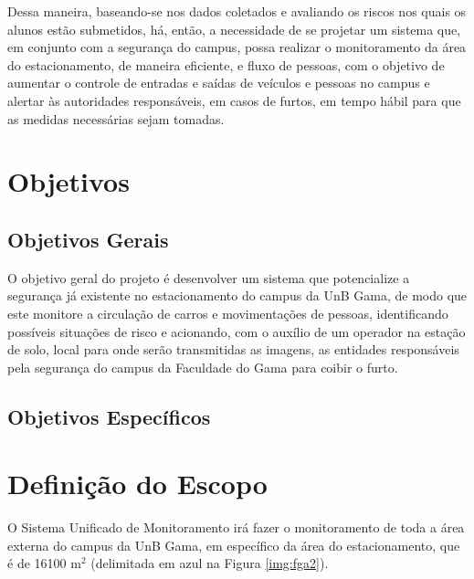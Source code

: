 Dessa maneira, baseando-se nos dados coletados e avaliando os riscos nos quais os alunos estão submetidos, há, então, a necessidade de se projetar  um sistema que, em conjunto com a segurança do campus, possa realizar o monitoramento  da área do estacionamento, de maneira eficiente, e fluxo de pessoas, com o objetivo de aumentar o controle de entradas e saídas de veículos e pessoas no campus e alertar às autoridades responsáveis, em casos de furtos, em tempo hábil para que as medidas necessárias sejam tomadas.


\section{Objetivos} %
\label{sec:objetivos}

  \subsection{Objetivos Gerais} %
  \label{sub:objetivos_gerais}

  O objetivo geral do projeto é desenvolver um sistema que potencialize a segurança já existente no estacionamento do campus da UnB Gama, de modo que este monitore a circulação de carros e movimentações de pessoas, identificando possíveis situações de risco e acionando, com o auxílio de um operador na estação de solo, local para onde serão transmitidas as imagens, as entidades responsáveis pela segurança do campus da Faculdade do Gama para coibir o furto.

  \subsection{Objetivos Específicos} %
  \label{sub:objetivos_espec_ficos}


\section{Definição do Escopo} %
\label{sec:defini_o_do_escopo}


  O Sistema Unificado de Monitoramento irá fazer o monitoramento de toda a área externa do campus da UnB Gama, em específico da área do estacionamento, que é de 16100 m$^2$ (delimitada em azul na Figura \ref{img:fga2}).

